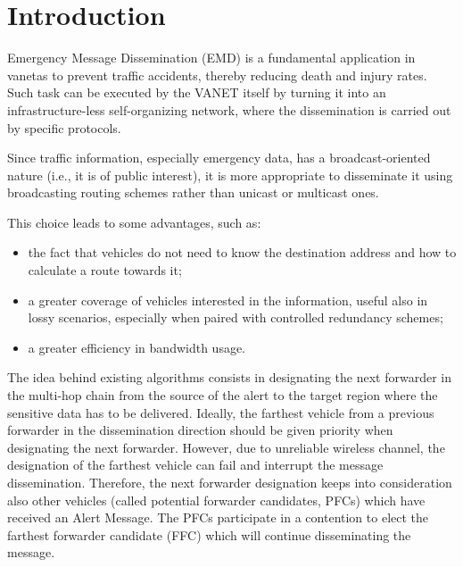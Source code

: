 
\chapter{Introduction}
	\label{sec:emd}
	Emergency Message Dissemination (EMD) is a fundamental application in \acrshort{vaneta}s to prevent traffic accidents, thereby reducing death and injury rates. Such task can be executed by the VANET itself by turning it into an infrastructure-less self-organizing network, where the dissemination is carried out by specific protocols. 
	
	
	Since traffic information, especially emergency data, has a broadcast-oriented nature (i.e., it is of public interest), it is more appropriate to disseminate it using broadcasting routing schemes rather than unicast or multicast ones.\cite{5989903}
	
	This choice leads to some advantages, such as:
	\begin{itemize}
		\item the fact that vehicles do not need to know the destination address and how to calculate a route towards it;
		\item a greater coverage of vehicles interested in the information, useful also in lossy scenarios, especially when paired with controlled redundancy schemes;
		\item a greater efficiency in bandwidth usage.
	\end{itemize}
	
	The idea behind existing algorithms consists in designating the next forwarder in the multi-hop chain from the source of the alert to the target region where the sensitive data has to be delivered. Ideally, the farthest vehicle from a previous forwarder in the dissemination direction should be given priority when designating the next forwarder. However, due to unreliable wireless channel, the designation of the farthest vehicle can fail and interrupt the message dissemination. Therefore, the next forwarder designation keeps into consideration also other vehicles (called potential forwarder candidates, PFCs) which have received an Alert Message. The PFCs participate in a contention to elect the farthest forwarder candidate (FFC) which will continue disseminating the message.
	
